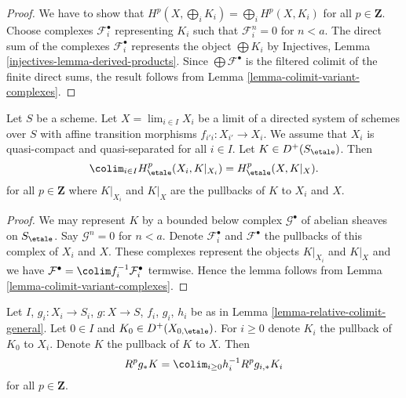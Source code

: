 \begin{proof}
We have to show that $H^p(X, \bigoplus_i K_i) =
\bigoplus_i H^p(X, K_i)$ for all $p \in \mathbf{Z}$.
Choose complexes $\mathcal{F}_i^\bullet$ representing $K_i$
such that $\mathcal{F}_i^n = 0$ for $n < a$.
The direct sum of the complexes $\mathcal{F}_i^\bullet$
represents the object $\bigoplus K_i$ by
Injectives, Lemma \ref{injectives-lemma-derived-products}.
Since $\bigoplus \mathcal{F}^\bullet$ is the filtered
colimit of the finite direct sums, the result follows
from Lemma \ref{lemma-colimit-variant-complexes}.
\end{proof}

\begin{lemma}
\label{lemma-colimit-complexes}
Let $S$ be a scheme. Let $X = \lim_{i \in I} X_i$ be a limit of a
directed system of schemes over $S$ with affine transition morphisms
$f_{i'i} : X_{i'} \to X_i$. We assume that $X_i$ is quasi-compact and
quasi-separated for all $i \in I$. Let $K \in D^+(S_\etale)$. Then
$$
\colim_{i \in I} H_\etale^p(X_i, K|_{X_i}) = H_\etale^p(X, K|_X).
$$
for all $p \in \mathbf{Z}$ where $K|_{X_i}$ and $K|_X$
are the pullbacks of $K$ to $X_i$ and $X$.
\end{lemma}

\begin{proof}
We may represent $K$ by a bounded below complex $\mathcal{G}^\bullet$
of abelian sheaves on $S_\etale$. Say $\mathcal{G}^n = 0$ for $n < a$.
Denote $\mathcal{F}^\bullet_i$ and $\mathcal{F}^\bullet$ the pullbacks
of this complex of $X_i$ and $X$. These complexes represent the
objects $K|_{X_i}$ and $K|_X$ and we have
$\mathcal{F}^\bullet = \colim f_i^{-1}\mathcal{F}_i^\bullet$
termwise. Hence the lemma follows from
Lemma \ref{lemma-colimit-variant-complexes}.
\end{proof}

\begin{lemma}
\label{lemma-relative-colimit-general-complexes}
Let $I$, $g_i : X_i \to S_i$, $g : X \to S$, $f_i$, $g_i$, $h_i$ be as in
Lemma \ref{lemma-relative-colimit-general}.
Let $0 \in I$ and $K_0 \in D^+(X_{0, \etale})$.
For $i \geq 0$ denote $K_i$ the pullback of $K_0$ to $X_i$.
Denote $K$ the pullback of $K$ to $X$. Then
$$
R^pg_*K = \colim_{i \geq 0} h_i^{-1}R^pg_{i, *}K_i
$$
for all $p \in \mathbf{Z}$.
\end{lemma}

